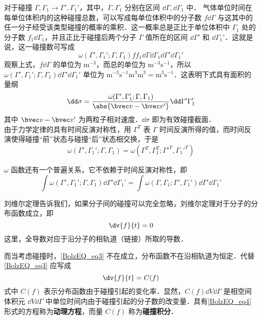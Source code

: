  对于碰撞 $\Gamma,\Gamma_1\rightarrow\Gamma',\Gamma_1'$，其中，$\Gamma,\Gamma_1$ 分别在区间 $\dd\Gamma,\dd\Gamma_1$ 中． 气体单位时间在每单位体积内的这种碰撞总数，可以写成每单位体积中的分子数 $f\dd\Gamma$ 与这其中的任一分子经受该类型碰撞的概率的乘积．这一概率总是正比于单位体积中 $\Gamma_1$ 处的分子数 $f_1\dd \Gamma_1$，并且正比于碰撞后两个分子 $\Gamma$ 值所在的区间 $\dd\Gamma'$ 和 $\dd \Gamma_1'$．这就是说，这一碰撞数可写成
 \begin{equation}\label{BolzEQ_eq5}
\omega(\Gamma',\Gamma_1';\Gamma,\Gamma_1)ff_1\dd\Gamma\dd\Gamma_1\dd\Gamma'\dd\Gamma_1'
 \end{equation}
 观察上式，$f\dd \Gamma$ 的单位为 $\mathrm{m^{-3}}$，而总的单位为 $\mathrm{m^{-3}s^{-1}}$，所以 $\omega(\Gamma',\Gamma_1';\Gamma,\Gamma_1)\dd\Gamma'\dd\Gamma_1'$ 单位为 $\mathrm{m^{-3}s^{-1}m^{3}m^{3}=m^3s^{-1}}$．这表明下式具有面积的量纲
 \begin{equation}\label{BolzEQ_eq2}
 \dd \sigma=\frac{\omega(\Gamma',\Gamma_1';\Gamma,\Gamma_1)}{\abs{\bvec v-\bvec v'}}\dd\Gamma'\Gamma_1'
 \end{equation}
 其中 $\bvec v-\bvec v'$ 为两粒子相对速度．$\dd\sigma$ 即为有效碰撞截面．\\

由于力学定律的具有时间反演对称性，用 $\Gamma^T$ 表 $\Gamma$ 时间反演所得的值，而时间反演使得碰撞“前”状态与碰撞“后”状态相交换，于是
 \begin{equation}
 \omega(\Gamma',\Gamma_1';\Gamma,\Gamma_1)=\omega(\Gamma^T,\Gamma_1^T;\Gamma'^T,\Gamma_1'^T)
 \end{equation}
 
$\omega$ 函数还有一个普遍关系，它不依赖于时间反演对称性，即
\begin{equation}
\int\omega(\Gamma',\Gamma_1';\Gamma,\Gamma_1)\dd\Gamma'\dd\Gamma_1'=\int\omega(\Gamma,\Gamma_1;\Gamma',\Gamma_1')\dd\Gamma'\dd\Gamma_1'
\end{equation}


 刘维尔定理告诉我们，如果分子间的碰撞可以完全忽略，刘维尔定理对于分子的分布函数成立，即
 \begin{equation}\label{BolzEQ_eq3}
 \dv{f}{t}=0
 \end{equation}
 这里，全导数对应于沿分子的相轨道（链接）所取的导数．

 而当考虑碰撞时，\autoref{BolzEQ_eq3} 不在成立，分布函数不在沿相轨道为恒定．代替\autoref{BolzEQ_eq3} 应写成
 \begin{equation}\label{BolzEQ_eq4}
 \dv{f}{t}=C(f)
 \end{equation}
 式中 $C(f)$ 表示分布函数由于碰撞引起的变化率．显然，$C(f)\dd V\dd\Gamma$ 是相空间体积元 $\dd V\dd\Gamma$ 中单位时间内由于碰撞引起的分子数的改变量．具有\autoref{BolzEQ_eq4} 形式的方程称为\textbf{动理方程}，而量 $C(f)$ 称为\textbf{碰撞积分}．

